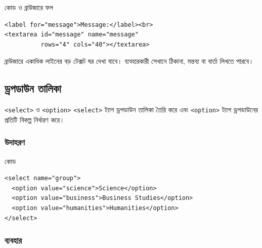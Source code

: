 \begin{chFourWholeExample}{কোড ও ব্রাউজারে ফল}
\noindent
\begin{minipage}[t]{.50\linewidth}\vspace{0pt}

\begin{verbatim}
<label for="message">Message:</label><br>
<textarea id="message" name="message"
          rows="4" cols="40"></textarea>
\end{verbatim}

\end{minipage}\hfill
\begin{minipage}[t]{.46\linewidth}\vspace{0pt}
ব্রাউজারে একাধিক লাইনের বড় টেক্সট ঘর দেখা যাবে। ব্যবহারকারী সেখানে ঠিকানা, মন্তব্য বা বার্তা লিখতে পারবে।
\end{minipage}

\end{chFourWholeExample}

\subsection{ড্রপডাউন তালিকা}

\begin{definitionbox}{\texttt{<select>} ও \texttt{<option>}}
\texttt{<select>} ট্যাগ ড্রপডাউন তালিকা তৈরি করে এবং \texttt{<option>} ট্যাগ ড্রপডাউনের প্রতিটি বিকল্প নির্ধারণ করে।
\end{definitionbox}

\subsubsection{উদাহরণ}

\begin{examplebox}{কোড}
\par\noindent\begin{minipage}{\linewidth}
\begin{verbatim}
<select name="group">
  <option value="science">Science</option>
  <option value="business">Business Studies</option>
  <option value="humanities">Humanities</option>
</select>
\end{verbatim}
\end{minipage}\par
\end{examplebox}

\subsubsection{ব্যবহার}


